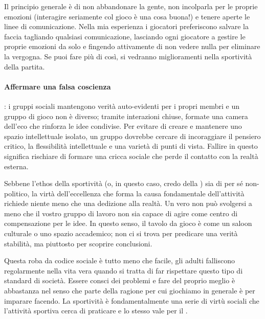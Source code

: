 Il principio generale è di non abbandonare la gente, non incolparla per le proprie emozioni (interagire seriamente col gioco è una cosa buona!) e tenere aperte le linee di comunicazione. Nella mia esperienza i giocatori preferiscono salvare la faccia tagliando qualsiasi comunicazione, lasciando ogni giocatore a gestire le proprie emozioni da solo e fingendo attivamente di non vedere nulla per eliminare la vergogna. Se puoi fare più di così, si vedranno miglioramenti nella sportività della partita.

\paragraph{Affermare una falsa coscienza}: i gruppi sociali mantengono verità auto-evidenti per i propri membri e un gruppo di gioco non è diverso; tramite interazioni chiuse, formate una camera dell'eco che rinforza le idee condivise. Per evitare di creare e mantenere uno spazio intellettuale isolato, un gruppo dovrebbe cercare di incoraggiare il pensiero critico, la flessibilità intellettuale e una varietà di punti di vista. Fallire in questo significa rischiare di formare una cricca sociale che perde il contatto con la realtà esterna.

Sebbene l'ethos della sportività (o, in questo caso, credo della ) sia di per sé non-politico, la virtà dell'eccellenza che forma la causa fondamentale dell'attività richiede niente meno che una dedizione alla realtà. Un vero  non può svolgersi a meno che il vostro gruppo di lavoro non sia capace di agire come centro di compensazione per le idee. In questo senso, il tavolo da gioco è come un saloon culturale o uno spazio accademico; non ci si trova per predicare una verità stabilità, ma piuttosto per scoprire conclusioni.

Questa roba da codice sociale è tutto meno che facile, gli adulti falliscono regolarmente nella vita vera quando si tratta di far rispettare questo tipo di standard di società. Essere consci dei problemi e fare del proprio meglio è abbastanza nel senso che parte della ragione per cui giochiamo in generale è per imparare facendo. La sportività è fondamentalmente una serie di virtù sociali che l'attività sportiva cerca di praticare e lo stesso vale per il .



